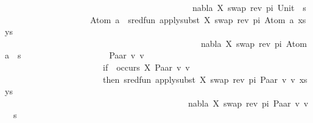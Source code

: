 \begin{isabellebody}
\ \ \ \ \ \ \ \ \ \ \ \ \ \ \ \ \ \ \ \ \ \ \ \ \ \ \ \ \ \ \ \ \ \ \ \ \ \ \ \ \ \ \ \ nabla{\isacharcomma}{\kern0pt}\ {\isacharbrackleft}{\kern0pt}{\isacharparenleft}{\kern0pt}X{\isacharcomma}{\kern0pt}\ swap\ {\isacharparenleft}{\kern0pt}rev\ pi{\isacharparenright}{\kern0pt}\ Unit{\isacharparenright}{\kern0pt}{\isacharbrackright}{\kern0pt}\ {\isasymbullet}\ s{\isacharparenright}{\kern0pt}\isanewline
\ \ \ \ \ \ \ \ \ \ \ \ \ \ \ \ \ \ \ {\isacharbar}{\kern0pt}\ Atom\ a\ {\isasymRightarrow}\ sred{\isacharunderscore}{\kern0pt}fun\ {\isacharparenleft}{\kern0pt}apply{\isacharunderscore}{\kern0pt}subst\ {\isacharbrackleft}{\kern0pt}{\isacharparenleft}{\kern0pt}X{\isacharcomma}{\kern0pt}\ swap\ {\isacharparenleft}{\kern0pt}rev\ pi{\isacharparenright}{\kern0pt}\ {\isacharparenleft}{\kern0pt}Atom\ a{\isacharparenright}{\kern0pt}{\isacharparenright}{\kern0pt}{\isacharbrackright}{\kern0pt}\ {\isacharparenleft}{\kern0pt}xs{\isacharcomma}{\kern0pt}\ ys{\isacharparenright}{\kern0pt}{\isacharcomma}{\kern0pt}\isanewline
\ \ \ \ \ \ \ \ \ \ \ \ \ \ \ \ \ \ \ \ \ \ \ \ \ \ \ \ \ \ \ \ \ \ \ \ \ \ \ \ \ \ \ \ \ \ nabla{\isacharcomma}{\kern0pt}\ {\isacharbrackleft}{\kern0pt}{\isacharparenleft}{\kern0pt}X{\isacharcomma}{\kern0pt}\ swap\ {\isacharparenleft}{\kern0pt}rev\ pi{\isacharparenright}{\kern0pt}\ {\isacharparenleft}{\kern0pt}Atom\ a{\isacharparenright}{\kern0pt}{\isacharparenright}{\kern0pt}{\isacharbrackright}{\kern0pt}\ {\isasymbullet}\ s{\isacharparenright}{\kern0pt}\isanewline
\ \ \ \ \ \ \ \ \ \ \ \ \ \ \ \ \ \ \ {\isacharbar}{\kern0pt}\ Paar\ v{}\ v{}\ {\isasymRightarrow}\isanewline
\ \ \ \ \ \ \ \ \ \ \ \ \ \ \ \ \ \ \ \ \ \ \ if\ {\isasymnot}\ occurs\ X\ {\isacharparenleft}{\kern0pt}Paar\ v{}\ v{}{\isacharparenright}{\kern0pt}\isanewline
\ \ \ \ \ \ \ \ \ \ \ \ \ \ \ \ \ \ \ \ \ \ \ then\ sred{\isacharunderscore}{\kern0pt}fun\ {\isacharparenleft}{\kern0pt}apply{\isacharunderscore}{\kern0pt}subst\ {\isacharbrackleft}{\kern0pt}{\isacharparenleft}{\kern0pt}X{\isacharcomma}{\kern0pt}\ swap\ {\isacharparenleft}{\kern0pt}rev\ pi{\isacharparenright}{\kern0pt}\ {\isacharparenleft}{\kern0pt}Paar\ v{}\ v{}{\isacharparenright}{\kern0pt}{\isacharparenright}{\kern0pt}{\isacharbrackright}{\kern0pt}\ {\isacharparenleft}{\kern0pt}xs{\isacharcomma}{\kern0pt}\ ys{\isacharparenright}{\kern0pt}{\isacharcomma}{\kern0pt}\isanewline
\ \ \ \ \ \ \ \ \ \ \ \ \ \ \ \ \ \ \ \ \ \ \ \ \ \ \ \ \ \ \ \ \ \ \ \ \ \ \ \ \ \ \ nabla{\isacharcomma}{\kern0pt}\ {\isacharbrackleft}{\kern0pt}{\isacharparenleft}{\kern0pt}X{\isacharcomma}{\kern0pt}\ swap\ {\isacharparenleft}{\kern0pt}rev\ pi{\isacharparenright}{\kern0pt}\ {\isacharparenleft}{\kern0pt}Paar\ v{}\ v{}{\isacharparenright}{\kern0pt}{\isacharparenright}{\kern0pt}{\isacharbrackright}{\kern0pt}\ {\isasymbullet}\ s{\isacharparenright}{\kern0pt}\isanewline

\end{isabellebody}
